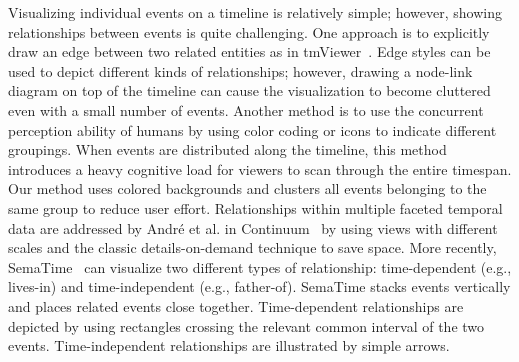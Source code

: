 

Visualizing individual events on a timeline is relatively simple; however, showing relationships between events is quite challenging. One approach is to explicitly draw an edge between two related entities as in tmViewer~\cite{Kumar1998}. Edge styles can be used to depict different kinds of relationships; however, drawing a node-link diagram on top of the timeline can cause the visualization to become cluttered even with a small number of events. Another method is to use the concurrent perception ability of humans by using color coding or icons to indicate different groupings. When events are distributed along the timeline, this method introduces a heavy cognitive load for viewers to scan through the entire timespan. Our method uses colored backgrounds and clusters all events belonging to the same group to reduce user effort. Relationships within multiple faceted temporal data are addressed by Andr\'{e} et al. in Continuum~\cite{Andre2007} by using views with different scales and the classic details-on-demand technique to save space. More recently, SemaTime~\cite{Stab2010} can visualize two different types of relationship: time-dependent (e.g., lives-in) and time-independent (e.g., father-of). SemaTime stacks events vertically and places related events close together. Time-dependent relationships are depicted by using rectangles crossing the relevant common interval of the two events. Time-independent relationships are illustrated by simple arrows.

